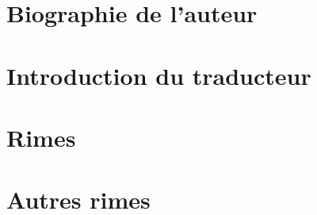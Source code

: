 \documentclass[a4paper,fontsize=13pt,twoside,final]{scrbook}
\begin{document}
\thispagestyle{empty}







\setcounter{page}{7}

\part{Biographie de l'auteur}


\part{Introduction du traducteur}



\part{Rimes}


\part{Autres rimes}


\bigskip

\tableofcontents
\end{document}
